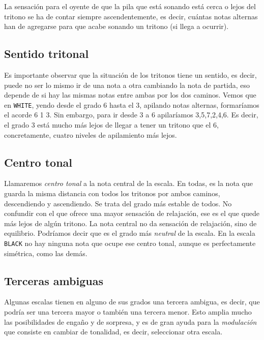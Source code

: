 \documentclass[]{report}
\begin{document}
La sensación para el oyente de que la pila que está sonando está cerca o lejos del tritono se ha de contar siempre ascendentemente, es decir, cuántas notas alternas han de agregarse para que acabe sonando un tritono (si llega a ocurrir).

\subsection{Sentido tritonal}
Es importante observar que la situación de los tritonos tiene un sentido, es decir, puede no ser lo mismo ir de una nota a otra cambiando la nota de partida, eso depende de si hay las mismas notas entre ambas por los dos caminos. Vemos que en \texttt{WHITE}, yendo desde el grado 6 hasta el 3, apilando notas alternas, formaríamos el acorde 6 1 3. Sin embargo, para ir desde 3 a 6 apilaríamos 3,5,7,2,4,6. Es decir, el grado 3 está mucho más lejos de llegar a tener un tritono que el 6, concretamente, cuatro niveles de apilamiento más lejos.

\subsection{Centro tonal}

Llamaremos \emph{centro tonal} a la nota central de la escala. En todas, es la nota que guarda la misma distancia con todos los tritonos por ambos caminos, descendiendo y ascendiendo. Se trata del grado más estable de todos. No confundir con el que ofrece una mayor sensación de relajación, ese es el que quede más lejos de algún tritono. La nota central no da sensación de relajación, sino de equilibrio. Podríamos decir que es el grado más \emph{neutral} de la escala. En la escala \texttt{BLACK} no hay ninguna nota que ocupe ese centro tonal, aunque es perfectamente simétrica, como las demás.

\subsection{Terceras ambiguas}

Algunas escalas tienen en alguno de sus grados una tercera ambigua, es decir, que podría ser una tercera mayor o también una tercera menor. Esto amplia mucho las posibilidades de engaño y de sorpresa, y es de gran ayuda para la \emph{modulación} que consiste en cambiar de tonalidad, es decir, seleccionar otra escala.
\end{document}
